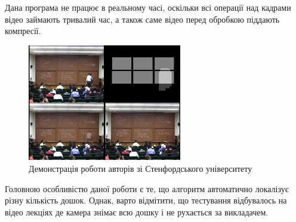 Дана програма не працює в реальному часі, оскільки всі операції над кадрами
відео займають тривалий час, а також саме відео перед обробкою
піддають компресії.
\begin{figure}[H]
  \centering
  \includegraphics[width=0.6\textwidth]{images/suh}
  \caption{Демонстрація роботи авторів зі Стенфордського університету \cite{suh}
    \label{fig:suh}
  }
\end{figure}
Головною особливістю даної роботи є те, що  алгоритм автоматично локалізує
різну кількість дошок. Однак, варто відмітити, що тестування відбувалось на
відео лекціях де камера знімає всю дошку і не рухається за викладачем.

